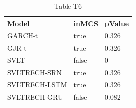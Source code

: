 \begin{table}[htbp]
\centering
\caption{Table T6}
\label{tab:T6}
\begin{tabular}{lll}
\toprule
Model & inMCS & pValue \\
\midrule
GARCH-t & true & 0.326 \\
GJR-t & true & 0.326 \\
SVLT & false & 0 \\
SVLTRECH-SRN & true & 0.326 \\
SVLTRECH-LSTM & true & 0.326 \\
SVLTRECH-GRU & false & 0.082 \\
\bottomrule
\end{tabular}
\end{table}
